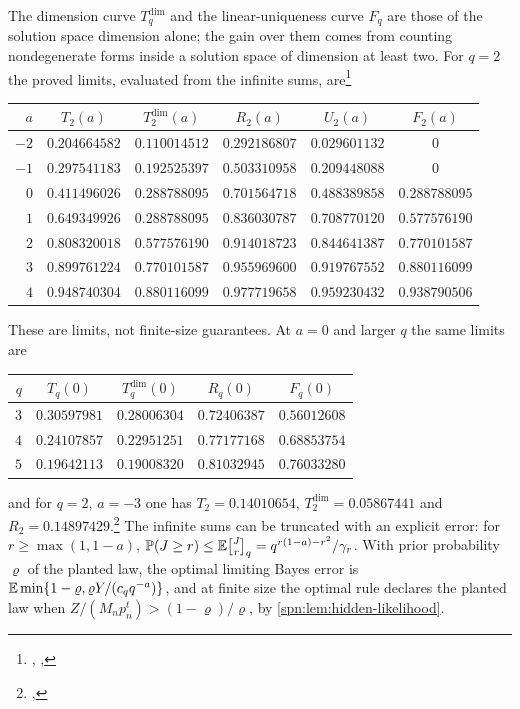 The dimension curve $T^{\dim}_q$ and the linear-uniqueness curve $F_q$ are those of the solution
space dimension alone; the gain over them comes from counting nondegenerate forms inside a solution
space of dimension at least two. For $q=2$ the proved limits, evaluated from the infinite sums,
are\footnote{\raggedright{},
,
}
\begin{center}\small
\begin{tabular}{rccccc}
\toprule
$a$ & $T_2(a)$ & $T^{\dim}_2(a)$ & $R_2(a)$ & $U_2(a)$ & $F_2(a)$\\
\midrule
$-2$ & $0.204664582$ & $0.110014512$ & $0.292186807$ & $0.029601132$ & $0$\\
$-1$ & $0.297541183$ & $0.192525397$ & $0.503310958$ & $0.209448088$ & $0$\\
$0$ & $0.411496026$ & $0.288788095$ & $0.701564718$ & $0.488389858$ & $0.288788095$\\
$1$ & $0.649349926$ & $0.288788095$ & $0.836030787$ & $0.708770120$ & $0.577576190$\\
$2$ & $0.808320018$ & $0.577576190$ & $0.914018723$ & $0.844641387$ & $0.770101587$\\
$3$ & $0.899761224$ & $0.770101587$ & $0.955969600$ & $0.919767552$ & $0.880116099$\\
$4$ & $0.948740304$ & $0.880116099$ & $0.977719658$ & $0.959230432$ & $0.938790506$\\
\bottomrule
\end{tabular}
\end{center}
These are limits, not finite-size guarantees. At $a=0$ and larger $q$ the same limits are
\begin{center}\small
\begin{tabular}{rcccc}
\toprule
$q$ & $T_q(0)$ & $T^{\dim}_q(0)$ & $R_q(0)$ & $F_q(0)$\\
\midrule
$3$ & $0.30597981$ & $0.28006304$ & $0.72406387$ & $0.56012608$\\
$4$ & $0.24107857$ & $0.22951251$ & $0.77177168$ & $0.68853754$\\
$5$ & $0.19642113$ & $0.19008320$ & $0.81032945$ & $0.76033280$\\
\bottomrule
\end{tabular}
\end{center}
and for $q=2$, $a=-3$ one has $T_2=0.14010654$, $T^{\dim}_2=0.05867441$ and
$R_2=0.14897429$.\footnote{\raggedright{},
} The infinite sums can be
truncated with an explicit error: for $r\ge\max(1,1-a)$,
$\spnP(J\ge r)\le\spnE\spnqbin Jr{q}=q^{r(1-a)-r^2}/\gamma_r$. With prior probability $\varrho$ of the
planted law, the optimal limiting Bayes error is $\mathbb{E}\min\{1-\varrho,\varrho Y/(c_qq^{-a})\}$, and at
finite size the optimal rule declares the planted law when $Z/(M_np_n^t)>(1-\varrho)/\varrho$, by
\cref{spn:lem:hidden-likelihood}.

